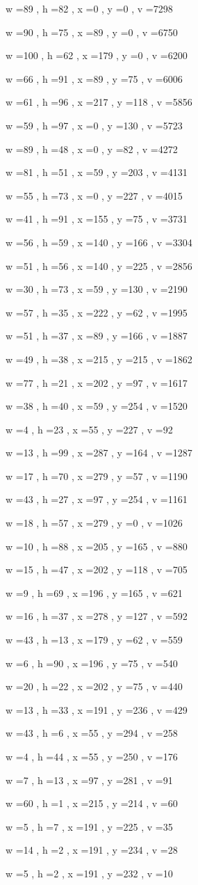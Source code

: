 \documentclass[11pt]{article}
\begin{document}
w =89 , h =82 , x =0 , y =0 , v =7298
\par
w =90 , h =75 , x =89 , y =0 , v =6750
\par
w =100 , h =62 , x =179 , y =0 , v =6200
\par
w =66 , h =91 , x =89 , y =75 , v =6006
\par
w =61 , h =96 , x =217 , y =118 , v =5856
\par
w =59 , h =97 , x =0 , y =130 , v =5723
\par
w =89 , h =48 , x =0 , y =82 , v =4272
\par
w =81 , h =51 , x =59 , y =203 , v =4131
\par
w =55 , h =73 , x =0 , y =227 , v =4015
\par
w =41 , h =91 , x =155 , y =75 , v =3731
\par
w =56 , h =59 , x =140 , y =166 , v =3304
\par
w =51 , h =56 , x =140 , y =225 , v =2856
\par
w =30 , h =73 , x =59 , y =130 , v =2190
\par
w =57 , h =35 , x =222 , y =62 , v =1995
\par
w =51 , h =37 , x =89 , y =166 , v =1887
\par
w =49 , h =38 , x =215 , y =215 , v =1862
\par
w =77 , h =21 , x =202 , y =97 , v =1617
\par
w =38 , h =40 , x =59 , y =254 , v =1520
\par
w =4 , h =23 , x =55 , y =227 , v =92
\par
w =13 , h =99 , x =287 , y =164 , v =1287
\par
w =17 , h =70 , x =279 , y =57 , v =1190
\par
w =43 , h =27 , x =97 , y =254 , v =1161
\par
w =18 , h =57 , x =279 , y =0 , v =1026
\par
w =10 , h =88 , x =205 , y =165 , v =880
\par
w =15 , h =47 , x =202 , y =118 , v =705
\par
w =9 , h =69 , x =196 , y =165 , v =621
\par
w =16 , h =37 , x =278 , y =127 , v =592
\par
w =43 , h =13 , x =179 , y =62 , v =559
\par
w =6 , h =90 , x =196 , y =75 , v =540
\par
w =20 , h =22 , x =202 , y =75 , v =440
\par
w =13 , h =33 , x =191 , y =236 , v =429
\par
w =43 , h =6 , x =55 , y =294 , v =258
\par
w =4 , h =44 , x =55 , y =250 , v =176
\par
w =7 , h =13 , x =97 , y =281 , v =91
\par
w =60 , h =1 , x =215 , y =214 , v =60
\par
w =5 , h =7 , x =191 , y =225 , v =35
\par
w =14 , h =2 , x =191 , y =234 , v =28
\par
w =5 , h =2 , x =191 , y =232 , v =10
\par
\newpage
\end{document}
